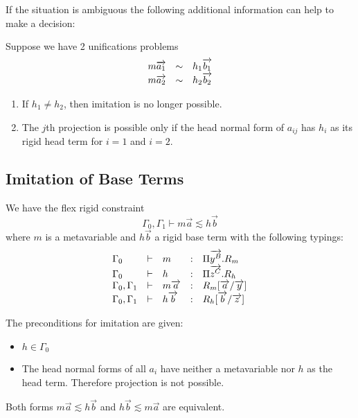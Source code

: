 If the situation is ambiguous the following additional information can help to
make a decision:

Suppose we have 2 unifications problems
$$
\begin{array}{lllll} 
    m {\overrightarrow {a_1}} &\sim& h_1 {\overrightarrow {b_1}}
    \\
    m {\overrightarrow {a_2}} &\sim& h_2 {\overrightarrow {b_2}}
 \end{array}
$$

\begin{enumerate}

    \item If $h_1 \ne h_2$, then imitation is no longer possible.

    \item The $j$th projection is possible only if the head normal form of
        $a_{ij}$ has $h_i$ as its rigid head term for $i=1$ and $i=2$.
\end{enumerate}









\subsection{Imitation of Base Terms}

We have the flex rigid constraint
$$
    \Gamma_0, \Gamma_1 \vdash m \vec a \lesssim h \vec b
$$
where $m$ is a metavariable and $h \vec b$ a rigid base term with the following
typings:
$$
\begin{array}{lllll} 
    \Gamma_0 &\vdash& m &:& \Pi {\overrightarrow {y^B}}. R_m
    \\
    \Gamma_0 &\vdash& h &:& \Pi {\overrightarrow {z^C}}. R_h
    \\
    \Gamma_0, \Gamma_1 &\vdash& m {\overrightarrow {a}} &:& R_m[{\overrightarrow {a}} / {\overrightarrow {y}}]
    \\
    \Gamma_0, \Gamma_1 &\vdash& h {\overrightarrow {b}} &:& R_h[{\overrightarrow {b}} / {\overrightarrow {z}}]
 \end{array}
$$

The preconditions for imitation are given:
\begin{itemize}

    \item $h \in \Gamma_0$

    \item The head normal forms of all $a_i$ have neither a metavariable nor $h$
        as the head term. Therefore projection is not possible.

\end{itemize}

Both forms $m \vec a \lesssim h \vec b$ and $h \vec b \lesssim m \vec a$ are
equivalent.

